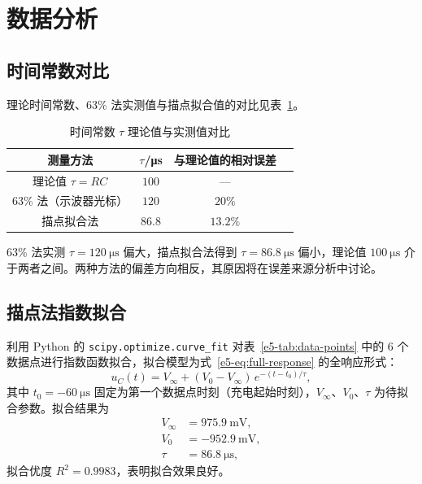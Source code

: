 \section{数据分析}

\subsection{时间常数对比}

理论时间常数、63\% 法实测值与描点拟合值的对比见表~\ref{e5-tab:tau-comparison}。

\begin{table}[H]
    \centering
    \caption{时间常数 \(\tau\) 理论值与实测值对比}
    \label{e5-tab:tau-comparison}
    \begin{tabular}{cccc}
        \toprule
        测量方法 & \(\tau\)/\si{\micro\second} & 与理论值的相对误差 \\
        \midrule
        理论值 \(\tau = RC\) & \(100\) & --- \\
        63\% 法（示波器光标） & \(120\) & \(20\%\) \\
        描点拟合法 & \(86.8\) & \(13.2\%\) \\
        \bottomrule
    \end{tabular}
\end{table}

63\% 法实测 \(\tau = \SI{120}{\micro\second}\) 偏大，描点拟合法得到 \(\tau = \SI{86.8}{\micro\second}\) 偏小，理论值 \(\SI{100}{\micro\second}\) 介于两者之间。两种方法的偏差方向相反，其原因将在误差来源分析中讨论。

\subsection{描点法指数拟合}

利用 Python 的 \texttt{scipy.optimize.curve\_fit} 对表~\ref{e5-tab:data-points} 中的 6 个数据点进行指数函数拟合，拟合模型为式~\eqref{e5-eq:full-response} 的全响应形式：
\begin{equation}
    u_C(t) = V_\infty + (V_0 - V_\infty)\,e^{-(t-t_0)/\tau},
\end{equation}
其中 \(t_0 = \SI{-60}{\micro\second}\) 固定为第一个数据点时刻（充电起始时刻），\(V_\infty\)、\(V_0\)、\(\tau\) 为待拟合参数。拟合结果为
\begin{align}
    V_\infty &= \SI{975.9}{\milli\volt}, \\
    V_0 &= \SI{-952.9}{\milli\volt}, \\
    \tau &= \SI{86.8}{\micro\second},
\end{align}
拟合优度 \(R^2 = 0.9983\)，表明拟合效果良好。

